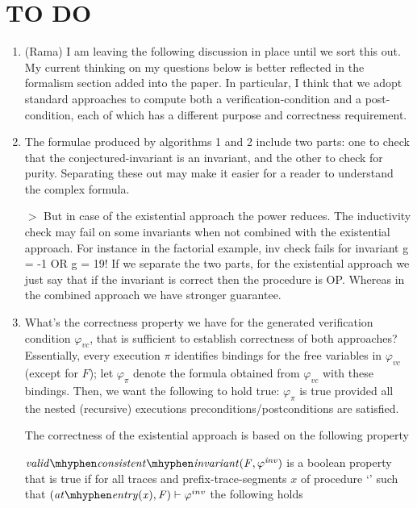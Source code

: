 \section*{TO DO}

\begin{enumerate}

\item (Rama) I am leaving the following discussion in place until we sort this out.
My current thinking on my questions below is better reflected in the formalism
section added into the paper. In particular, I think that we adopt standard
approaches to compute both a verification-condition and a post-condition,
each of which has a different purpose and correctness requirement.

\item The formulae produced by algorithms 1 and 2 include two parts:
one to check that the conjectured-invariant is an invariant, and the
other to check for purity. Separating these out may make it easier for
a reader to understand the complex formula.

$>$ But in case of the existential approach the power reduces. The
inductivity check may fail on some invariants when not combined with
the existential approach. For instance in the factorial example, inv
check fails for invariant g = -1 OR g = 19! If we separate the two
parts, for the existential approach we just say that if the invariant
is correct then the procedure is OP. Whereas in the combined approach
we have stronger guarantee. 

\item What's the correctness property we have for the generated verification
condition $\varphi_{vc}$, that is sufficient to establish correctness of both approaches?
Essentially, every execution $\pi$ identifies bindings for the free variables in $\varphi_{vc}$ (except for $F$);
let $\varphi_\pi$ denote the formula obtained from $\varphi_{vc}$ with these bindings.
Then, we want the following to hold true: $\varphi_\pi$ is true provided all the
nested (recursive) executions preconditions/postconditions are satisfied.

The correctness of the existential approach is based on the following property

\begin{definition}
  \label{def:validConsistentInvariant}
  $\\\vci{\F}{\inv}$ is a boolean property that is true if for all
  traces and prefix-trace-segments $x$ of procedure `\foo' such that
  $(\atEntry{x}, \F) \satisfies \inv$ the following holds


\end{definition}
\end{enumerate}
